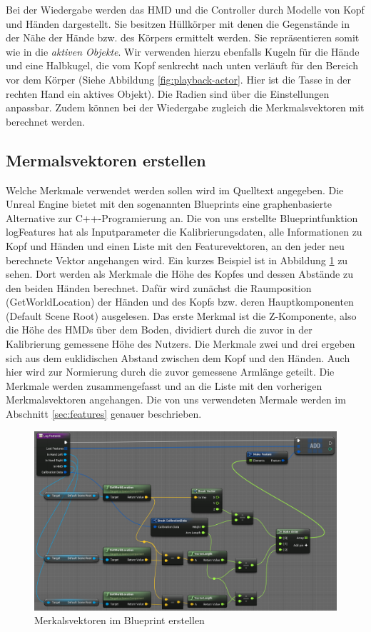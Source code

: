 Bei der Wiedergabe werden das HMD und die Controller durch Modelle von Kopf und Händen dargestellt. Sie besitzen Hüllkörper mit denen die Gegenstände in der Nähe der Hände bzw. des Körpers ermittelt werden. Sie repräsentieren somit wie in \cite{scene-grok} die \textit{aktiven Objekte}. Wir verwenden hierzu ebenfalls Kugeln für die Hände und eine Halbkugel, die vom Kopf senkrecht nach unten verläuft für den Bereich vor dem Körper (Siehe Abbildung \ref{fig:playback-actor}. Hier ist die Tasse in der rechten Hand ein aktives Objekt). Die Radien sind über die Einstellungen anpassbar. Zudem können bei der Wiedergabe zugleich die Merkmalsvektoren mit berechnet werden.

\subsection{Mermalsvektoren erstellen}
Welche Merkmale verwendet werden sollen wird im Quelltext angegeben. Die Unreal Engine bietet mit den sogenannten Blueprints eine graphenbasierte Alternative zur C++-Programierung an. Die von uns erstellte Blueprintfunktion \glqq{}logFeatures\grqq{} hat als Inputparameter die Kalibrierungsdaten, alle Informationen zu Kopf und Händen und einen Liste mit den Featurevektoren, an den jeder neu berechnete Vektor angehangen wird. Ein kurzes Beispiel ist in Abbildung \ref{fig:log-features} zu sehen. Dort werden als Merkmale die Höhe des Kopfes und dessen Abstände zu den beiden Händen berechnet. Dafür wird zunächst die Raumposition (\glqq{}GetWorldLocation\grqq{}) der Händen und des Kopfs bzw. deren Hauptkomponenten (\glqq{}Default Scene Root\grqq{}) ausgelesen. Das erste Merkmal ist die Z-Komponente, also die Höhe des HMDs über dem Boden, dividiert durch die zuvor in der Kalibrierung gemessene Höhe des Nutzers. Die Merkmale zwei und drei ergeben sich aus dem euklidischen Abstand zwischen dem Kopf und den Händen. Auch hier wird zur Normierung durch die zuvor gemessene Armlänge geteilt. Die Merkmale werden zusammengefasst und an die Liste mit den vorherigen Merkmalsvektoren angehangen. Die von uns verwendeten Mermale werden im Abschnitt \ref{sec:features} genauer beschrieben.
\begin{figure}[hbtp]
\includegraphics[width=1.0\linewidth]{LogFeatures.png}
\caption{Merkalsvektoren im Blueprint erstellen}
\label{fig:log-features}
\end{figure}

